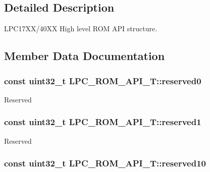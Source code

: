 \subsection{Detailed Description}
L\+P\+C17\+X\+X/40\+X\+X High level R\+O\+M A\+P\+I structure. 

\subsection{Member Data Documentation}
\hypertarget{struct_l_p_c___r_o_m___a_p_i___t_a93487c5be9000ba3b633bd6c354f8589}{
\subsubsection[{reserved0}]{\setlength{\rightskip}{0pt plus 5cm}const uint32\+\_\+t L\+P\+C\+\_\+\+R\+O\+M\+\_\+\+A\+P\+I\+\_\+\+T\+::reserved0}}\label{struct_l_p_c___r_o_m___a_p_i___t_a93487c5be9000ba3b633bd6c354f8589}
Reserved \hypertarget{struct_l_p_c___r_o_m___a_p_i___t_a2fce9202473b5986d54262b3d5548e82}{
\subsubsection[{reserved1}]{\setlength{\rightskip}{0pt plus 5cm}const uint32\+\_\+t L\+P\+C\+\_\+\+R\+O\+M\+\_\+\+A\+P\+I\+\_\+\+T\+::reserved1}}\label{struct_l_p_c___r_o_m___a_p_i___t_a2fce9202473b5986d54262b3d5548e82}
Reserved \hypertarget{struct_l_p_c___r_o_m___a_p_i___t_afb1226faead704ffe1e0c7c5efcb86f2}{
\subsubsection[{reserved10}]{\setlength{\rightskip}{0pt plus 5cm}const uint32\+\_\+t L\+P\+C\+\_\+\+R\+O\+M\+\_\+\+A\+P\+I\+\_\+\+T\+::reserved10}}\label{struct_l_p_c___r_o_m___a_p_i___t_afb1226faead704ffe1e0c7c5efcb86f2}
